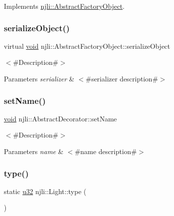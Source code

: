 Implements \mbox{\hyperlink{classnjli_1_1_abstract_factory_object_aad2fbe86fb3bdecf02918a96b9c57976}{njli\+::\+Abstract\+Factory\+Object}}.

\mbox{\label{classnjli_1_1_light_a4fc4bcd9d1930911474210c047372fc0}} 
\subsubsection{\texorpdfstring{serialize\+Object()}{serializeObject()}}
{\footnotesize\ttfamily virtual \mbox{\hyperlink{_thread_8h_af1e856da2e658414cb2456cb6f7ebc66}{void}} njli\+::\+Abstract\+Factory\+Object\+::serialize\+Object}

$<$\#\+Description\#$>$


\begin{DoxyParams}{Parameters}
{\em serializer} & $<$\#serializer description\#$>$ \\
\hline
\end{DoxyParams}
\mbox{\label{classnjli_1_1_light_a087eb5f8d9f51cc476f12f1d10a3cb95}} 
\subsubsection{\texorpdfstring{set\+Name()}{setName()}}
{\footnotesize\ttfamily \mbox{\hyperlink{_thread_8h_af1e856da2e658414cb2456cb6f7ebc66}{void}} njli\+::\+Abstract\+Decorator\+::set\+Name}

$<$\#\+Description\#$>$


\begin{DoxyParams}{Parameters}
{\em name} & $<$\#name description\#$>$ \\
\hline
\end{DoxyParams}
\mbox{\label{classnjli_1_1_light_aa33ddd3945fc8bf5510edb43b97cab08}} 
\subsubsection{\texorpdfstring{type()}{type()}}
{\footnotesize\ttfamily static \mbox{\hyperlink{_util_8h_a10e94b422ef0c20dcdec20d31a1f5049}{u32}} njli\+::\+Light\+::type (\begin{DoxyParamCaption}{ }\end{DoxyParamCaption})\hspace{0.3cm}{\ttfamily [static]}}

